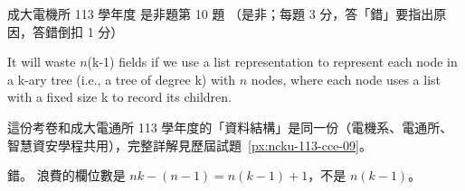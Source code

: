 \begin{pastexam}[label={px:ncku-113-ee-09}]{成大電機所 113 學年度 是非題第 10 題}
（是非；每題 3 分，答「錯」要指出原因，答錯倒扣 1 分）

It will waste $n$(k-1) fields if we use a list representation to represent each node in a k-ary
tree (i.e., a tree of degree k) with $n$ nodes, where each node uses a list with a fixed size k to
record its children.
\end{pastexam}

\begin{pastsoln}
這份考卷和成大電通所 113 學年度的「資料結構」是同一份（電機系、電通所、智慧資安學程共用），完整詳解見歷屆試題~\ref{px:ncku-113-cce-09}。

錯。 浪費的欄位數是 $nk - (n - 1) = n(k - 1) + 1$，不是 $n(k - 1)$。
\end{pastsoln}
